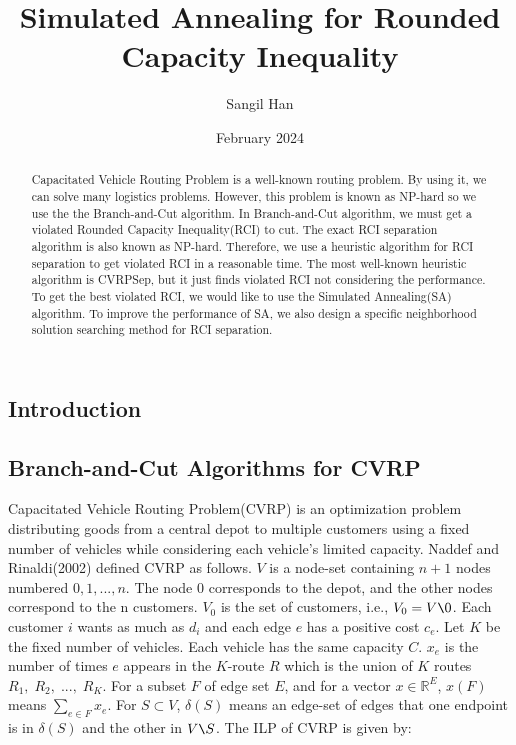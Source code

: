 \documentclass[11pt]{article}
\begin{document}
\title{Simulated Annealing for Rounded Capacity Inequality}
\author{Sangil Han}
\date{February 2024}
\maketitle
\begin{spacing}{1.5}
\begin {abstract}
    Capacitated Vehicle Routing Problem is a well-known routing problem. By using it, we can solve many logistics problems. However, this problem is known as NP-hard so we use the the Branch-and-Cut algorithm. In Branch-and-Cut algorithm, we must get a violated Rounded Capacity Inequality(RCI) to cut. The exact RCI separation algorithm is also known as NP-hard. Therefore, we use a heuristic algorithm for RCI separation to get violated RCI in a reasonable time. The most well-known heuristic algorithm is CVRPSep, but it just finds violated RCI not considering the performance. To get the best violated RCI, we would like to use the Simulated Annealing(SA) algorithm. To improve the performance of SA, we also design a specific neighborhood solution searching method for RCI separation.
\end{abstract}

\thispagestyle{empty}

\newpage
\thispagestyle{empty}
\tableofcontents

\newpage
\setcounter{page}{1}
{\centering \section {Introduction} \subsection{Branch-and-Cut Algorithms for CVRP}}
Capacitated Vehicle Routing Problem(CVRP) is an optimization problem distributing goods from a central depot to multiple customers using a fixed number of vehicles while considering each vehicle's limited capacity. Naddef and Rinaldi(2002) defined CVRP as follows\cite{CVRP}. $V$ is a node-set containing $n+1$ nodes numbered $0,1,...,n$. The node $0$ corresponds to the depot, and the other nodes correspond to the n customers. $V_0$ is the set of customers, i.e., $V_0=V\texttt{\char`\\}{0}$. Each customer $i$ wants as much as $d_i$ and each edge $e$ has a positive cost $c_e$. Let $K$ be the fixed number of vehicles. Each vehicle has the same capacity $C$. $x_e$ is the number of times $e$ appears in the $K$-route $R$ which is the union of $K$ routes $R_1,\; R_2,\;...,\;R_K$. For a subset $F$ of edge set $E$, and for a vector $x\in	\mathbb{R} ^E$, $x(F)$ means $\sum_{e\in F}x_e$. For $S \subset V$, $\delta(S)$ means an edge-set of edges that one endpoint is in $\delta(S)$ and the other in $V\texttt{\char`\\}S$. The ILP of CVRP is given by:


\end{spacing}
\end{document}
